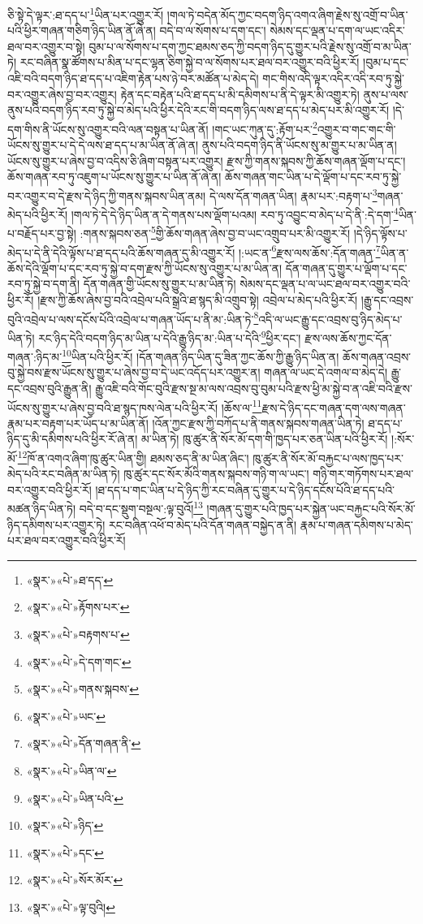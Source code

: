 ཅི་སྟེ་དེ་ལྟར་:ཐ་དད་པ་\footnote{«སྣར་»«པེ་»ཐ་དད་}ཡིན་པར་འགྱུར་རོ། །གལ་ཏེ་བདེན་མོད་ཀྱང་བདག་ཉིད་འགའ་ཞིག་རྗེས་སུ་འགྲོ་བ་ཡིན་པའི་ཕྱིར་གཞན་གཅིག་ཉིད་ཡིན་ནོ་ཞེ་ན། བདེ་བ་ལ་སོགས་པ་དག་དང་། སེམས་དང་ལྡན་པ་དག་ལ་ཡང་འདིར་ཐལ་བར་འགྱུར་བ་སྟེ། བུམ་པ་ལ་སོགས་པ་དག་ཀྱང་ཐམས་ཅད་ཀྱི་བདག་ཉིད་དུ་གྱུར་པའི་རྗེས་སུ་འགྲོ་བ་མ་ཡིན་ཏེ། རང་བཞིན་སྣ་ཚོགས་པ་མིན་པ་དང་ལྷན་ཅིག་སྐྱེ་བ་ལ་སོགས་པར་ཐལ་བར་འགྱུར་བའི་ཕྱིར་རོ། །བུམ་པ་དང་འཇི་བའི་བདག་ཉིད་ཐ་དད་པ་འཇིག་རྟེན་པས་ཉེ་བར་མཚོན་པ་མེད་དེ། གང་གིས་འདི་ལྟར་འདིར་འདི་རབ་ཏུ་སྐྱེ་བར་འགྱུར་ཞེས་བྱ་བར་འགྱུར། རྟེན་དང་བརྟེན་པའི་ཐ་དད་པ་མི་དམིགས་པ་ནི་དེ་ལྟར་མི་འགྱུར་ཏེ། ནུས་པ་ལས་ནུས་པའི་བདག་ཉིད་རབ་ཏུ་སྐྱེ་བ་མེད་པའི་ཕྱིར་དེའི་རང་གི་བདག་ཉིད་ལས་ཐ་དད་པ་མེད་པར་མི་འགྱུར་རོ། །དེ་དག་གིས་ནི་ཡོངས་སུ་འགྱུར་བའི་ལན་བསྟན་པ་ཡིན་ནོ། །གང་ཡང་ཀུན་དུ་:རྟོག་པར་\footnote{«སྣར་»«པེ་»རྟོགས་པར་}འགྱུར་བ་གང་གང་གི་ཡོངས་སུ་གྱུར་པ་དེ་དེ་ལས་ཐ་དད་པ་མ་ཡིན་ནོ་ཞེ་ན། ནུས་པའི་བདག་ཉིད་ནི་ཡོངས་སུ་མ་གྱུར་པ་མ་ཡིན་ན། ཡོངས་སུ་གྱུར་པ་ཞེས་བྱ་བ་འདིས་ཅི་ཞིག་བསྟན་པར་འགྱུར། རྫས་ཀྱི་གནས་སྐབས་ཀྱི་ཆོས་གཞན་ལྡོག་པ་དང་། ཆོས་གཞན་རབ་ཏུ་འཇུག་པ་ཡོངས་སུ་གྱུར་པ་ཡིན་ནོ་ཞེ་ན། ཆོས་གཞན་གང་ཡིན་པ་དེ་ལྡོག་པ་དང་རབ་ཏུ་སྐྱེ་བར་འགྱུར་བ་དེ་རྫས་དེ་ཉིད་ཀྱི་གནས་སྐབས་ཡིན་ནམ། དེ་ལས་དོན་གཞན་ཡིན། རྣམ་པར་:བརྟག་པ་\footnote{«སྣར་»«པེ་»བརྟགས་པ་}གཞན་མེད་པའི་ཕྱིར་རོ། །གལ་ཏེ་དེ་དེ་ཉིད་ཡིན་ན་དེ་གནས་པས་ལྡོག་པའམ། རབ་ཏུ་འབྱུང་བ་མེད་པ་དེ་ནི་:དེ་དག་\footnote{«སྣར་»«པེ་»དེ་དག་གང་}ཡིན་པ་བརྗོད་པར་བྱ་སྟེ། :གནས་སྐབས་ཅན་\footnote{«སྣར་»«པེ་»གནས་སྐབས་}གྱི་ཆོས་གཞན་ཞེས་བྱ་བ་ཡང་འགྲུབ་པར་མི་འགྱུར་རོ། །དེ་ཉིད་ལྟོས་པ་མེད་པ་དེ་ནི་དེའི་ལྟོས་པ་ཐ་དད་པའི་ཆོས་གཞན་དུ་མི་འགྱུར་རོ། །:ཡང་ན་\footnote{«སྣར་»«པེ་»ཡང་}རྫས་ལས་ཆོས་:དོན་གཞན་\footnote{«སྣར་»«པེ་»དོན་གཞན་ནི་}ཡིན་ན་ཆོས་དེའི་ལྡོག་པ་དང་རབ་ཏུ་སྐྱེ་བ་དག་རྫས་ཀྱི་ཡོངས་སུ་འགྱུར་པ་མ་ཡིན་ན། དོན་གཞན་དུ་གྱུར་པ་ལྡོག་པ་དང་རབ་ཏུ་སྐྱེ་བ་དག་ནི། དོན་གཞན་གྱི་ཡོངས་སུ་གྱུར་པ་མ་ཡིན་ཏེ། སེམས་དང་ལྡན་པ་ལ་ཡང་ཐལ་བར་འགྱུར་བའི་ཕྱིར་རོ། །རྫས་ཀྱི་ཆོས་ཞེས་བྱ་བའི་འབྲེལ་པའི་སྒྲའི་ཐ་སྙད་མི་འགྲུབ་སྟེ། འབྲེལ་པ་མེད་པའི་ཕྱིར་རོ། །རྒྱུ་དང་འབྲས་བུའི་འབྲེལ་པ་ལས་དངོས་པོའི་འབྲེལ་པ་གཞན་ཡོད་པ་ནི་མ་:ཡིན་ཏེ་\footnote{«སྣར་»«པེ་»ཡིན་ལ་}འདི་ལ་ཡང་རྒྱུ་དང་འབྲས་བུ་ཉིད་མེད་པ་ཡིན་ཏེ། རང་ཉིད་དེའི་བདག་ཉིད་མ་ཡིན་པ་དེའི་རྒྱུ་ཉིད་མ་:ཡིན་པ་དེའི་\footnote{«སྣར་»«པེ་»ཡིན་པའི་}ཕྱིར་དང་། རྫས་ལས་ཆོས་ཀྱང་དོན་གཞན་:ཉིད་མ་\footnote{«སྣར་»«པེ་»ཉིད་}ཡིན་པའི་ཕྱིར་རོ། །དོན་གཞན་ཉིད་ཡིན་དུ་ཟིན་ཀྱང་ཆོས་ཀྱི་རྒྱུ་ཉིད་ཡིན་ན། ཆོས་གཞན་འབྲས་བུ་སྐྱེ་བས་རྫས་ཡོངས་སུ་གྱུར་པ་ཞེས་བྱ་བ་དེ་ཡང་འདོད་པར་འགྱུར་ན། གཞན་ལ་ཡང་དེ་འགལ་བ་མེད་དེ། རྒྱུ་དང་འབྲས་བུའི་རྒྱུན་ནི། རྒྱུ་འཇི་བའི་གོང་བུའི་རྫས་སྔ་མ་ལས་འབྲས་བུ་བུམ་པའི་རྫས་ཕྱི་མ་སྐྱེ་བ་ན་འཇི་བའི་རྫས་ཡོངས་སུ་གྱུར་པ་ཞེས་བྱ་བའི་ཐ་སྙད་ཁས་ལེན་པའི་ཕྱིར་རོ། །ཆོས་ལ་\footnote{«སྣར་»«པེ་»དང་}རྫས་དེ་ཉིད་དང་གཞན་དག་ལས་གཞན་རྣམ་པར་བརྟག་པར་ཡོད་པ་མ་ཡིན་ནོ། །འོན་ཀྱང་རྫས་ཀྱི་བཀོད་པ་ནི་གནས་སྐབས་གཞན་ཡིན་ཏེ། ཐ་དད་པ་ཉིད་དུ་མི་དམིགས་པའི་ཕྱིར་རོ་ཞེ་ན། མ་ཡིན་ཏེ། ཁུ་ཚུར་ནི་སོར་མོ་དག་གི་ཁྱད་པར་ཅན་ཡིན་པའི་ཕྱིར་རོ། །:སོར་མོ་\footnote{«སྣར་»«པེ་»སོར་མོར་}ཁོ་ན་འགའ་ཞིག་ཁུ་ཚུར་ཡིན་གྱི། ཐམས་ཅད་ནི་མ་ཡིན་ཞིང་། ཁུ་ཚུར་ནི་སོར་མོ་བརྐྱང་པ་ལས་ཁྱད་པར་མེད་པའི་རང་བཞིན་མ་ཡིན་ཏེ། ཁུ་ཚུར་དང་སོར་མོའི་གནས་སྐབས་གཉི་ག་ལ་ཡང་། གཉི་གར་གཏོགས་པར་ཐལ་བར་འགྱུར་བའི་ཕྱིར་རོ། །ཐ་དད་པ་གང་ཡིན་པ་དེ་ཉིད་ཀྱི་རང་བཞིན་དུ་གྱུར་པ་དེ་ཉིད་དངོས་པོའི་ཐ་དད་པའི་མཚན་ཉིད་ཡིན་ཏེ། བདེ་བ་དང་སྡུག་བསྔལ་:ལྟ་བུའོ།\footnote{«སྣར་»«པེ་»ལྟ་བུའི།} །གཞན་དུ་གྱུར་པའི་ཁྱད་པར་སྐྱེན་ཡང་བརྐྱང་པའི་སོར་མོ་ཉིད་དམིགས་པར་འགྱུར་ཏེ། རང་བཞིན་འཕོ་བ་མེད་པའི་དོན་གཞན་བསྐྱེད་ན་ནི། རྣམ་པ་གཞན་དམིགས་པ་མེད་པར་ཐལ་བར་འགྱུར་བའི་ཕྱིར་རོ། 